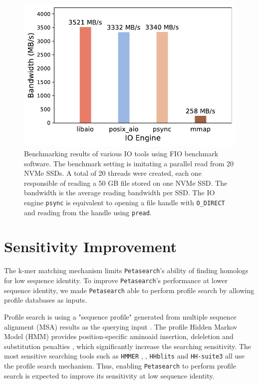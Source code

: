 \begin{figpage}
\begin{figure}[htbp]
    \label{fig:prot_seq_compress}
    \bigskip
    \centering
    \includegraphics[width=.65\textwidth]{images/fio_benchmark.pdf}
    \caption{Benchmarking results of various IO tools using FIO benchmark software.
      The benchmark setting is imitating a parallel read from 20 NVMe SSDs.
      A total of 20 threads were created, each one responsible of reading a 50 GB file stored on one NVMe SSD.
      The bandwidth is the average reading bandwidth per SSD.
      The IO engine \texttt{psync} is equivalent to opening a file handle with \texttt{O\_DIRECT} and reading from the handle using \texttt{pread}.}
    \label{fig:fio_benchmark}
  \end{figure}
\end{figpage}

\section{Sensitivity Improvement} \label{section:sensitivity-improvement}

The k-mer matching mechanism limits \texttt{Petasearch}'s ability of finding homologs for low sequence identity.
To improve \texttt{Petasearch}'s performance at lower sequence identity, we made \texttt{Petasearch} able to perform profile search by allowing profile databases as inputs.

Profile search is using a "sequence profile" generated from multiple sequence alignment (MSA) results as the querying input \cite{steinegger2019hh}.
The profile Hidden Markov Model (HMM) provides position-specific aminoaid insertion, deleletion and substitution penalties \cite{steinegger2019hh}, which significantly increase the searching sensitivity.
The most sensitive searching tools such as \texttt{HMMER} \cite{eddy2009new}, \cite{eddy2011accelerated}, \texttt{HHblits} \cite{remmert2012hhblits} and \texttt{HH-suite3} \cite{steinegger2019hh} all use the profile search mechanism.
Thus, enabling \texttt{Petasearch} to perform profile search is expected to improve its sensitivity at low sequence identity.

